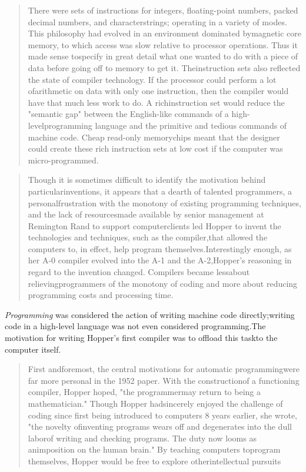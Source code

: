 \begin{quotation}
There were sets of instructions for integers, floating-point numbers, packed decimal numbers, and characterstrings; operating in a variety of modes. This philosophy had evolved in an environment dominated bymagnetic core memory, to which access was slow relative to processor operations. Thus it made sense tospecify in great detail what one wanted to do with a piece of data before going off to memory to get it. Theinstruction sets also reflected the state of compiler technology. If the processor could perform a lot ofarithmetic on data with only one instruction, then the compiler would have that much less work to do. A richinstruction set would reduce the "semantic gap" between the English-like commands of a high-levelprogramming language and the primitive and tedious commands of machine code. Cheap read-only memorychips meant that the designer could create these rich instruction sets at low cost if the computer was micro-programmed.\end{quotation}
\begin{quotation}
Though it is sometimes difficult to identify the motivation behind particularinventions, it appears that a dearth of talented programmers, a personalfrustration with the monotony of existing programming techniques, and the lack of resourcesmade available by senior management at Remington Rand to support computerclients led Hopper to invent the technologies and techniques, such as the compiler,that allowed the computers to, in effect, help program themselves.Interestingly enough, as her A-0 compiler evolved into the A-1 and the A-2,Hopper's reasoning in regard to the invention changed. Compilers became lessabout relievingprogrammers of the monotony of coding and more about reducing programming costs and processing time.\end{quotation}
\textit{Programming}
 was considered the action of writing machine code directly;writing code in a high-level language was not even considered programming.The motivation for writing Hopper's first compiler was to offload this taskto the computer itself.\begin{quotation}
First andforemost, the central motivations for automatic programmingwere far more personal in the 1952 paper. With the constructionof a functioning compiler, Hopper hoped, "the programmermay return to being a mathematician." Though Hopper hadsincerely enjoyed the challenge of coding since first being introduced to computers 8 years earlier, she wrote, "the novelty ofinventing programs wears off and degenerates into the dull laborof writing and checking programs. The duty now looms as animposition on the human brain." By teaching computers toprogram themselves, Hopper would be free to explore otherintellectual pursuits\end{quotation}
